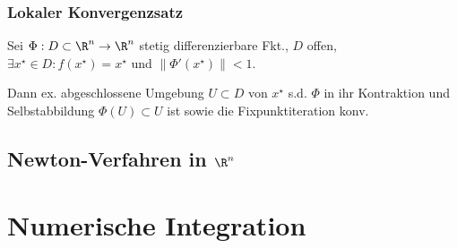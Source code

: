 \subsubsection*{Lokaler Konvergenzsatz}

Sei $\Phi : D \subset \R^n \to \R^n$ stetig differenzierbare Fkt., $D$ offen, $\exists x^\star \in D : f(x^\star)=x^\star$ und $\|\Phi'(x^\star)\| < 1$.

\vspace*{1mm}

Dann ex. abgeschlossene Umgebung $U \subset D$ von $x^\star$ s.d. $\Phi$ in ihr Kontraktion und Selbstabbildung $\Phi(U) \subset U$ ist sowie die Fixpunktiteration konv.

\subsection*{Newton-Verfahren in $\R^n$}

\section*{Numerische Integration}

